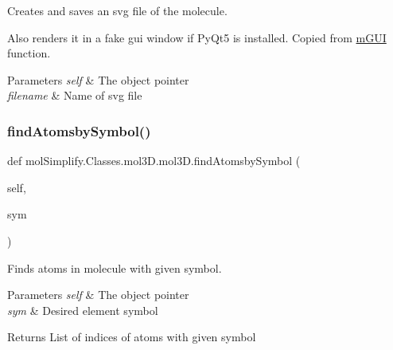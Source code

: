 Creates and saves an svg file of the molecule. 

Also renders it in a fake gui window if Py\+Qt5 is installed. Copied from \hyperlink{namespacemolSimplify_1_1Classes_1_1mGUI}{m\+G\+UI} function. 
\begin{DoxyParams}{Parameters}
{\em self} & The object pointer \\
\hline
{\em filename} & Name of svg file \\
\hline
\end{DoxyParams}
\mbox{\label{classmolSimplify_1_1Classes_1_1mol3D_1_1mol3D_adb95387b07a9714c03db4975a192e08c}} 
\subsubsection{\texorpdfstring{find\+Atomsby\+Symbol()}{findAtomsbySymbol()}}
{\footnotesize\ttfamily def mol\+Simplify.\+Classes.\+mol3\+D.\+mol3\+D.\+find\+Atomsby\+Symbol (\begin{DoxyParamCaption}\item[{}]{self,  }\item[{}]{sym }\end{DoxyParamCaption})}



Finds atoms in molecule with given symbol. 


\begin{DoxyParams}{Parameters}
{\em self} & The object pointer \\
\hline
{\em sym} & Desired element symbol \\
\hline
\end{DoxyParams}
\begin{DoxyReturn}{Returns}
List of indices of atoms with given symbol 
\end{DoxyReturn}
\mbox{\label{classmolSimplify_1_1Classes_1_1mol3D_1_1mol3D_a3a4f5d88b74124789e380f28d1038fad}} 

